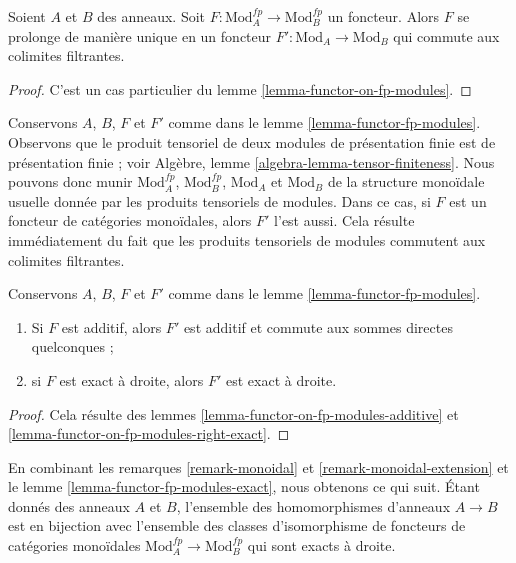 \begin{lemma}
\label{lemma-functor-fp-modules}
Soient $A$ et $B$ des anneaux. Soit
$F : \text{Mod}^{fp}_A \to \text{Mod}^{fp}_B$ un foncteur.
Alors $F$ se prolonge de manière unique en un foncteur
$F' : \text{Mod}_A \to \text{Mod}_B$
qui commute aux colimites filtrantes.
\end{lemma}

\begin{proof}
C'est un cas particulier du lemme \ref{lemma-functor-on-fp-modules}.
\end{proof}

\begin{remark}
\label{remark-monoidal-extension}
Conservons $A$, $B$, $F$ et $F'$ comme dans le lemme \ref{lemma-functor-fp-modules}.
Observons que le produit tensoriel de deux modules de présentation finie est
de présentation finie ; voir Algèbre, lemme \ref{algebra-lemma-tensor-finiteness}.
Nous pouvons donc munir $\text{Mod}^{fp}_A$, $\text{Mod}^{fp}_B$,
$\text{Mod}_A$ et $\text{Mod}_B$ de la structure monoïdale usuelle
donnée par les produits tensoriels de modules. Dans ce cas, si $F$ est
un foncteur de catégories monoïdales, alors $F'$ l'est aussi. Cela résulte immédiatement
du fait que les produits tensoriels de modules commutent aux colimites
filtrantes.
\end{remark}

\begin{lemma}
\label{lemma-functor-fp-modules-exact}
Conservons $A$, $B$, $F$ et $F'$ comme dans le lemme \ref{lemma-functor-fp-modules}.
\begin{enumerate}
\item Si $F$ est additif, alors $F'$ est additif et
commute aux sommes directes quelconques ;
\item si $F$ est exact à droite, alors $F'$ est exact à droite.
\end{enumerate}
\end{lemma}

\begin{proof}
Cela résulte des lemmes \ref{lemma-functor-on-fp-modules-additive} et
\ref{lemma-functor-on-fp-modules-right-exact}.
\end{proof}

\begin{remark}
\label{remark-monoidal-extension-exact}
En combinant les remarques \ref{remark-monoidal} et \ref{remark-monoidal-extension}
et le lemme \ref{lemma-functor-fp-modules-exact},
nous obtenons ce qui suit. Étant donnés des anneaux $A$ et $B$, l'ensemble des homomorphismes d'anneaux $A \to B$
est en bijection avec l'ensemble des classes d'isomorphisme
de foncteurs de catégories monoïdales $\text{Mod}^{fp}_A \to \text{Mod}^{fp}_B$
qui sont exacts à droite.
\end{remark}

